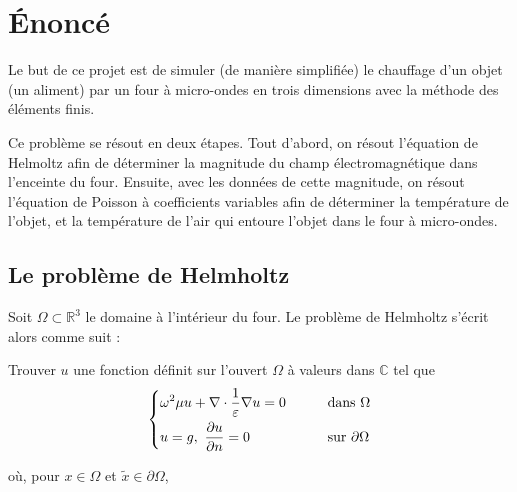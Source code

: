\section{Énoncé}

Le but de ce projet est de simuler (de manière simplifiée) le chauffage d'un
objet (un aliment) par un four à micro-ondes en trois dimensions avec la
méthode des éléments finis.

Ce problème se résout en deux étapes. Tout d'abord, on résout l'équation de Helmoltz
afin de déterminer la magnitude du champ électromagnétique dans l'enceinte du four.
Ensuite, avec les données de cette magnitude, on résout l'équation de Poisson à
coefficients variables afin de déterminer la température de l'objet, et la température
de l'air qui entoure l'objet dans le four à micro-ondes.


\subsection{Le problème de Helmholtz}

Soit $\Omega \subset \mathbb{R}^3$ le domaine à l'intérieur du four.
Le problème de Helmholtz s'écrit alors comme suit :

Trouver $u$ une fonction définit sur l'ouvert $\Omega$ à valeurs dans $\mathbb{C}$
tel que
\[\begin{dcases}
    \omega^2 \mu u + \nabla \cdot \frac{1}{\varepsilon} \nabla u = 0 \qquad
    & \text{dans } \Omega \\
    u = g, \ \frac{\partial u}{\partial n} = 0 & \text{sur } \partial \Omega
\end{dcases}\]



où, pour $x \in \Omega$ et $\tilde{x} \in \partial\Omega$,

